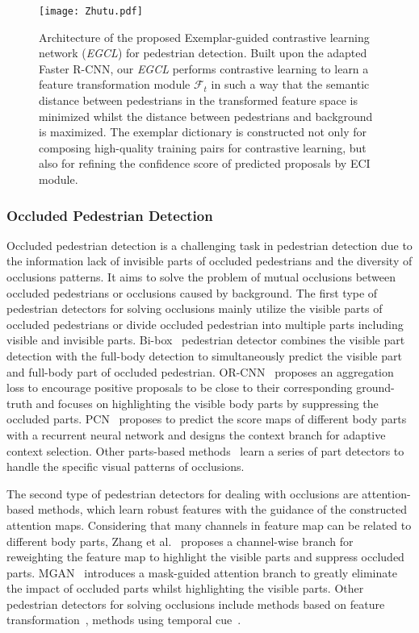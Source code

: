 \documentclass[journal]{IEEEtran}
\begin{document}
\begin{figure*}[t]
\centering
    \texttt{[image: Zhutu.pdf]}
\caption{Architecture of the proposed Exemplar-guided contrastive learning network (\emph{EGCL}) for pedestrian detection. Built upon the adapted Faster R-CNN, our \emph{EGCL} performs contrastive learning to learn a feature transformation module $\mathcal{F}_t$ in such a way that the semantic distance between pedestrians in the transformed feature space is minimized whilst the distance between pedestrians and background is maximized. The exemplar dictionary is constructed not only for composing high-quality training pairs for contrastive learning, but also for refining the confidence score of predicted proposals by ECI module.
}
\label{Fig:Framework}
\end{figure*}

\subsubsection{Occluded Pedestrian Detection}
Occluded pedestrian detection is a challenging task in pedestrian detection due to the information lack of invisible parts of occluded pedestrians and the diversity of occlusions patterns. It aims to solve the problem of mutual occlusions between occluded pedestrians or occlusions caused by background.
The first type of pedestrian detectors for solving occlusions mainly utilize the visible parts of occluded pedestrians or divide occluded pedestrian into multiple parts including visible and invisible parts. Bi-box~\cite{zhou2018bi} pedestrian detector combines the visible part detection with the full-body detection to simultaneously predict the visible part and full-body part of occluded pedestrian. OR-CNN~\cite{zhang2018occlusion} proposes an aggregation loss to encourage positive proposals to be close to their corresponding ground-truth and focuses on highlighting the visible body parts by suppressing the occluded parts. PCN~\cite{wang2018pcn} proposes to predict the score maps of different body parts with a recurrent neural network and designs the context branch for adaptive context selection. Other parts-based methods~\cite{tian2015deep,zhou2017multi} learn a series of part detectors to handle the specific visual patterns of occlusions.

The second type of pedestrian detectors for dealing with occlusions are attention-based methods, which learn robust features with the guidance of the constructed attention maps. Considering that many channels in feature map can be related to different body parts, Zhang et al.~\cite{zhang2018occluded} proposes a channel-wise branch for reweighting the feature map to highlight the visible parts and suppress occluded parts. MGAN~\cite{pang2019mask} introduces a mask-guided attention branch to greatly eliminate the impact of occluded parts whilst highlighting the visible parts. Other pedestrian detectors for solving occlusions include methods based on feature transformation~\cite{zhou2019discriminative}, methods using temporal cue~\cite{wu2020temporal}. 
\end{document}
